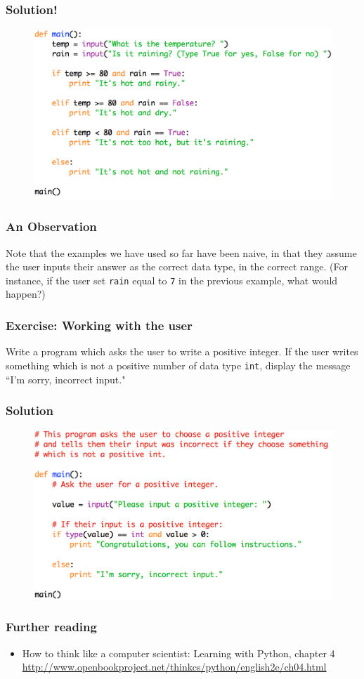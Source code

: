 \documentclass{beamer}
\begin{document}
\begin{frame}
\frametitle{Solution!}

\begin{figure}
\centering
\includegraphics[scale=0.6]{IMG/weather_elif.png}
\end{figure}
\end{frame}

\begin{frame}[fragile]
\frametitle{An Observation}

Note that the examples we have used so far have been naive, in that they assume the user inputs their answer as the correct data type, in the correct range. (For instance, if the user set \verb|rain| equal to \verb|7| in the previous example, what would happen?)
\end{frame}

\begin{frame}[fragile]
\frametitle{Exercise: Working with the user}

Write a program which asks the user to write a positive integer. If the user writes something which is not a positive number of data type \verb|int|, display the message ``I'm sorry, incorrect input."
\end{frame}

\begin{frame}
\frametitle{Solution}


\begin{figure}
\centering
\includegraphics[scale=0.6]{IMG/solution.png}
\end{figure}
\end{frame}


\begin{frame}
\frametitle{Further reading}

\begin{itemize}
\item How to think like a computer scientist: Learning with Python, chapter 4
\url{http://www.openbookproject.net/thinkcs/python/english2e/ch04.html}
\end{itemize}
\end{frame}
\end{document}
